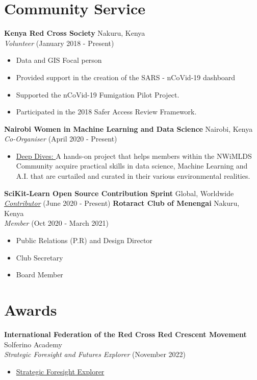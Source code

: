 \documentclass[line,margin,10pt]{res}
\begin{document}
\begin{resume}
\section{Community Service}
\textbf{Kenya Red Cross Society} \hfill Nakuru, Kenya\\
{\sl Volunteer} \hfill (January 2018 - Present)
\begin{itemize} \itemsep -2pt
    \item Data and GIS Focal person
    \item Provided support in the creation of the SARS - nCoVid-19 dashboard
    \item Supported the nCoVid-19 Fumigation Pilot Project.
    \item Participated in the 2018 Safer Access Review Framework.
\end{itemize}
\textbf{Nairobi Women in Machine Learning and Data Science} \hfill Nairobi, Kenya\\
{\sl Co-Organiser} \hfill (April 2020 - Present)
\begin{itemize} \itemsep -2pt
    \item \underline{Deep Dives: }
    A hands-on project that helps members within the NWiMLDS Community acquire practical skills in data science, Machine Learning and A.I. that are curtailed and curated in their various environmental realities.
\end{itemize}
\textbf{SciKit-Learn Open Source Contribution Sprint} \hfill Global, Worldwide\\
{\sl {\hyperref[https://sites.google.com/view/nyc-2020-scikit-sprint/contributors]{Contributor}}} \hfill (June 2020 - Present)
\textbf{Rotaract Club of Menengai} \hfill Nakuru, Kenya\\
{\sl Member} \hfill (Oct 2020 - March 2021)
\begin{itemize} \itemsep -2pt
    \item Public Relations (P.R) and Design Director
    \item Club Secretary
    \item Board Member
\end{itemize}
{\vspace{-0,25cm}}

\section{Awards}
\textbf{International Federation of the Red Cross Red Crescent Movement} \hfill Solferino Academy\\
{\sl Strategic Foresight and Futures Explorer} \hfill (November 2022)
\begin{itemize} \itemsep -2pt
    \item {\hyperref[https://www.virtualbadge.io/certificate-validator?credential=cer-433e718d-cb4c-4c07-9436-1bbb67b6]{Strategic Foresight Explorer}}
\end{itemize}
{\vspace{-0.25cm}}

\end{resume}
\end{document}
